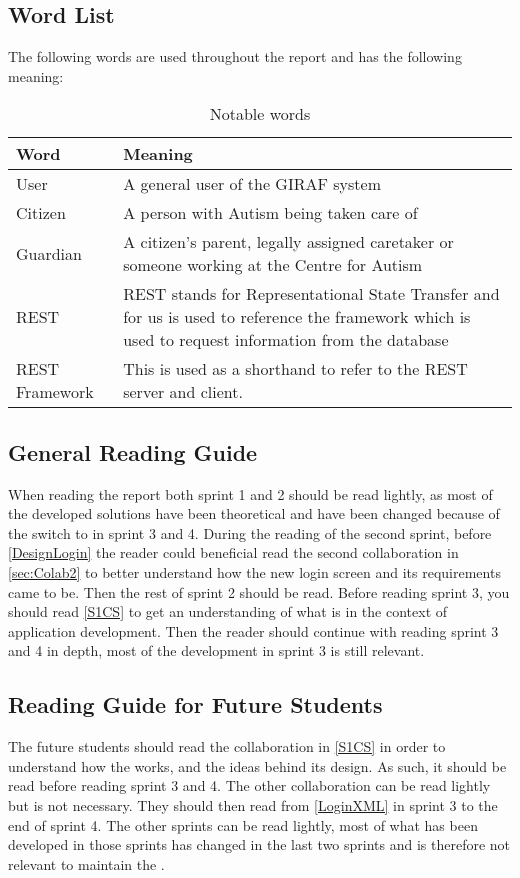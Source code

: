 \subsection{Word List}
The following words are used throughout the report and has the following
meaning:

\begin{table}[H]
\centering

\begin{tabular}{|l|p{6cm}|}
\hline
\textbf{Word} & \textbf{Meaning} \\ \hline
User & A general user of the GIRAF system \\ \hline
Citizen & A person with Autism being taken care of \\ \hline
Guardian & A citizen's parent, legally assigned caretaker or someone working
at the Centre for Autism\\ \hline
REST &  REST stands for Representational State Transfer and for us is used to
reference the framework which is used to request information from the database\\\hline
REST Framework & This is used as a shorthand to refer to the REST server and
client.\\\hline
\end{tabular}
\caption{Notable words}
\end{table}

\subsection{General Reading Guide}
When reading the report both sprint 1 and 2 should be read lightly, as most of
the developed solutions have been theoretical and have been changed because of
the switch to  in sprint 3 and 4. During the reading of the second
sprint, before \autoref{DesignLogin} the reader could beneficial read the second
collaboration in \autoref{sec:Colab2} to better understand how the new login screen and its requirements
came to be. Then the rest of sprint 2 should be read. Before reading sprint 3, you should read
\autoref{S1CS} to get an understanding of what  is in
the context of application development. Then the reader should continue with
reading sprint 3 and 4 in depth, most of the development in sprint 3 is still
relevant.

\subsection{Reading Guide for Future Students}
The future students should read the collaboration in \autoref{S1CS} in order to
understand how the  works, and the ideas behind its
design. As such, it should be read before reading sprint 3 and 4. The other
collaboration can be read lightly but is not necessary. They should then read
from \autoref{LoginXML} in sprint 3 to the end of sprint 4. The other sprints
can be read lightly, most of what has been developed in those sprints has
changed in the last two sprints and is therefore not relevant to maintain the
.

